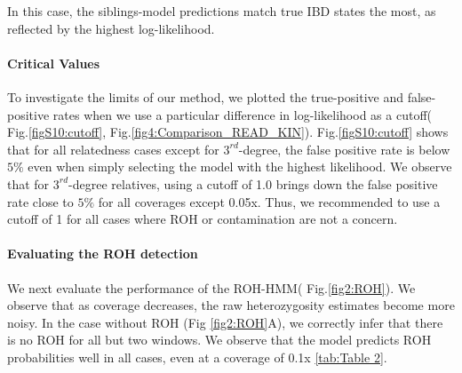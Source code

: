 \documentclass[12pt, letterpaper]{article}
\begin{document}
In this case, the siblings-model predictions match true IBD states the most, as reflected by the highest log-likelihood. 


\paragraph{Critical Values}
 To investigate the limits of our method, we plotted the true-positive and false-positive rates when we use a particular difference in log-likelihood as a cutoff( Fig.\ref{figS10:cutoff},  Fig.\ref{fig4:Comparison_READ_KIN}).   Fig.\ref{figS10:cutoff} shows that for all relatedness cases except for $3^{rd}$-degree, the false positive rate is below $5\%$ even when simply selecting the model with the highest likelihood. We observe that for $3^{rd}$-degree relatives, using a cutoff of 1.0 brings down the false positive rate close to $5\%$ for all coverages except 0.05x. Thus, we  recommended to use a cutoff of 1 for all cases where ROH or contamination are not a concern.


\paragraph{Evaluating the ROH detection}
We next evaluate the performance of the ROH-HMM( Fig.\ref{fig2:ROH}). We observe that as coverage decreases, the raw heterozygosity estimates become more noisy. In the case without ROH (Fig \ref{fig2:ROH}A), we correctly infer that there is no ROH for all but two windows. We observe that the model predicts ROH probabilities well in all cases, even at a coverage of 0.1x \ref{tab:Table 2}. 
\end{document}
